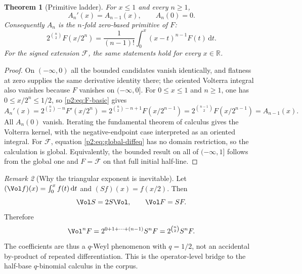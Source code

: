 \documentclass[11pt,oneside]{article}
\newtheorem{theorem}{Theorem}[section]
\theoremstyle{definition}
\theoremstyle{remark}
\newtheorem{remark}[theorem]{Remark}
\newcommand{\R}{\mathbb R}
\newcommand{\dd}{\,\mathrm d}
\newcommand{\1}{\mathbf 1}
\begin{document}
\begin{theorem}[Primitive ladder]
\label{p2:thm:primitive-ladder}
For $x\le1$ and every $n\ge1$,
\begin{equation}
 A_n'(x)=A_{n-1}(x),\qquad A_n(0)=0.                       \label{p2:eq:ladder-derivative}
\end{equation}
Consequently $A_n$ is the $n$-fold zero-based primitive of $F$:
\begin{equation}
 \boxed{
 2^{\binom n2}F(x/2^n)
 =\frac1{(n-1)!}\int_0^x(x-t)^{n-1}F(t)\dd t.}            \label{p2:eq:volterra-ladder}
\end{equation}
For the signed extension $\mathcal F$, the same statements hold for every
$x\in\R$.
\end{theorem}

\begin{proof}
On $(-\infty,0)$ all the bounded candidates vanish identically, and flatness
at zero supplies the same derivative identity there; the oriented Volterra
integral also vanishes because $F$ vanishes on $(-\infty,0]$.  For
$0\le x\le1$ and $n\ge1$, one has $0\le x/2^n\le1/2$, so
\eqref{p2:eq:F-basic} gives
\[
 A_n'(x)=2^{\binom n2-n}F'(x/2^n)
 =2^{\binom n2-n+1}F(x/2^{n-1})
 =2^{\binom{n-1}{2}}F(x/2^{n-1})=A_{n-1}(x).
\]
All $A_n(0)$ vanish.  Iterating the fundamental theorem of calculus gives the
Volterra kernel, with the negative-endpoint case interpreted as an oriented
integral.  For $\mathcal F$, equation \eqref{p2:eq:global-diffeq} has no domain
restriction, so the calculation is global.  Equivalently, the bounded result
on all of $(-\infty,1]$ follows from the global one and
$F=\mathcal F$ on that full initial half-line.
\end{proof}

\begin{remark}[Why the triangular exponent is inevitable]
Let $(\Vol f)(x)=\int_0^xf(t)\dd t$ and $(Sf)(x)=f(x/2)$.  Then
\begin{equation}
 \Vol S=2S\Vol,\qquad \Vol F=SF.                           \label{p2:eq:q-weyl}
\end{equation}
Therefore
\begin{equation}
 \Vol^nF=2^{0+1+\cdots+(n-1)}S^nF
 =2^{\binom n2}S^nF.                                      \label{p2:eq:q-weyl-ladder}
\end{equation}
The coefficients are thus a $q$-Weyl phenomenon with $q=1/2$, not an accidental
by-product of repeated differentiation.  This is the operator-level bridge to
the half-base $q$-binomial calculus in the corpus.
\end{remark}
\end{document}
